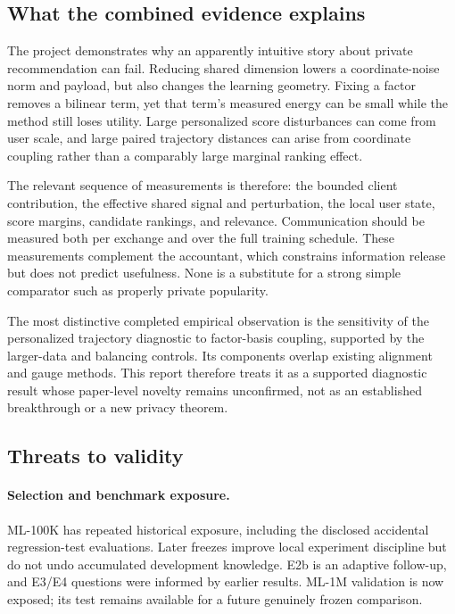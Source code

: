 \subsection{What the combined evidence explains}
The project demonstrates why an apparently intuitive story about private
recommendation can fail. Reducing shared dimension lowers a coordinate-noise
norm and payload, but also changes the learning geometry. Fixing a factor
removes a bilinear term, yet that term's measured energy can be small while
the method still loses utility. Large personalized score disturbances can
come from user scale, and large paired trajectory distances can arise from
coordinate coupling rather than a comparably large marginal ranking effect.

The relevant sequence of measurements is therefore: the bounded client
contribution, the effective shared signal and perturbation, the local user
state, score margins, candidate rankings, and relevance. Communication
should be measured both per exchange and over the full training schedule.
These measurements complement the accountant, which constrains information
release but does not predict usefulness. None is a substitute for a strong
simple comparator such as properly private popularity.

The most distinctive completed empirical observation is the sensitivity of
the personalized trajectory diagnostic to factor-basis coupling, supported
by the larger-data and balancing controls. Its components overlap existing
alignment and gauge methods. This report therefore treats it as a supported
diagnostic result whose paper-level novelty remains unconfirmed, not as an
established breakthrough or a new privacy theorem.

\subsection{Threats to validity}
\paragraph{Selection and benchmark exposure.}
ML-100K has repeated historical exposure, including the disclosed accidental
regression-test evaluations. Later freezes improve local experiment discipline
but do not undo accumulated development knowledge. E2b is an adaptive
follow-up, and E3/E4 questions were informed by earlier results. ML-1M
validation is now exposed; its test remains available for a future genuinely
frozen comparison.

